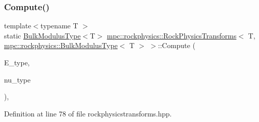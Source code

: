 \subsubsection{\texorpdfstring{Compute()}{Compute()}\hspace{0.1cm}{\footnotesize\ttfamily [5/8]}}
{\footnotesize\ttfamily template$<$typename T $>$ \\
static \mbox{\hyperlink{structmpc_1_1rockphysics_1_1_bulk_modulus_type}{Bulk\+Modulus\+Type}}$<$T$>$ \mbox{\hyperlink{structmpc_1_1rockphysics_1_1_rock_physics_transforms}{mpc\+::rockphysics\+::\+Rock\+Physics\+Transforms}}$<$ T, \mbox{\hyperlink{structmpc_1_1rockphysics_1_1_bulk_modulus_type}{mpc\+::rockphysics\+::\+Bulk\+Modulus\+Type}}$<$ T $>$ $>$\+::Compute (\begin{DoxyParamCaption}\item[{const \mbox{\hyperlink{structmpc_1_1rockphysics_1_1_youngs_modulus_type}{mpc\+::rockphysics\+::\+Youngs\+Modulus\+Type}}$<$ T $>$ \&}]{E\+\_\+type,  }\item[{const \mbox{\hyperlink{structmpc_1_1rockphysics_1_1_poissons_ratio_type}{mpc\+::rockphysics\+::\+Poissons\+Ratio\+Type}}$<$ T $>$ \&}]{nu\+\_\+type }\end{DoxyParamCaption})\hspace{0.3cm}{\ttfamily [inline]}, {\ttfamily [static]}}



Definition at line 78 of file rockphysicstransforms.\+hpp.

\mbox{\label{structmpc_1_1rockphysics_1_1_rock_physics_transforms_3_01_t_00_01mpc_1_1rockphysics_1_1_bulk_modulus_type_3_01_t_01_4_01_4_ab5af4b1efcaf09664386e4ced821f93a}} 
